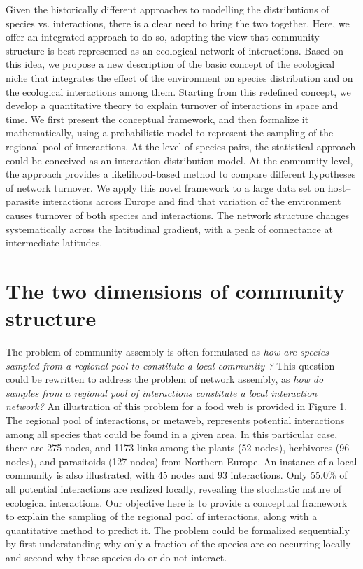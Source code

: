 \documentclass[12pt]{article}
\begin{document}
Given the historically different approaches to modelling the distributions of
species vs. interactions, there is a clear need to bring the two together.
Here, we offer an integrated approach to do so, adopting the view that community
structure is best represented as an ecological network of interactions. Based
on this idea, we propose a new description of the basic concept of the
ecological niche that integrates the effect of the environment on species
distribution and on the ecological interactions among them. Starting from this
redefined concept, we develop a quantitative theory to explain turnover of
interactions in space and time. We first present the conceptual framework, and
then formalize it mathematically, using a probabilistic model to represent the
sampling of the regional pool of interactions. At the level of species pairs,
the statistical approach could be conceived as an interaction distribution
model. At the community level, the approach provides a likelihood-based method
to compare different hypotheses of network turnover. We apply this novel
framework to a large data set on host–parasite interactions across Europe and
find that variation of the environment causes turnover of both species and
interactions. The network structure changes systematically across the
latitudinal gradient, with a peak of connectance at intermediate latitudes.

\section*{The two dimensions of community structure}

The problem of community assembly is often formulated as \textit{how are
species sampled from a regional pool to constitute a local community
\citep{Gotzenberger2012}?} This question could be rewritten to address the
problem of network assembly, as \textit{how do samples from a regional pool of
interactions constitute a local interaction network?} An illustration of this
problem for a food web is provided in Figure 1. The regional pool of interactions, or metaweb, represents
potential interactions among all species that could be found in a given area.
In this particular case, there are 275 nodes, and 1173 links among the plants (52
nodes), herbivores (96 nodes), and parasitoids (127 nodes) from Northern
Europe. An instance of a local community is also illustrated, with 45 nodes
and 93 interactions. Only 55.0\% of all potential interactions are realized locally,
revealing the stochastic nature of ecological interactions. Our objective here
is to provide a conceptual framework to explain the sampling of the regional
pool of interactions, along with a quantitative method to predict it. The
problem could be formalized sequentially by first understanding why only a
fraction of the species are co-occurring locally and second why these species
do or do not interact.
\end{document}
